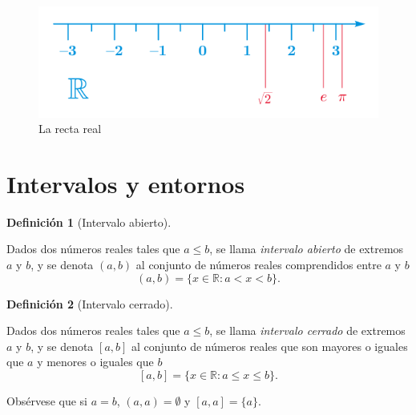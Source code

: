 \documentclass[
  a4paper,
]{scrreport}
\theoremstyle{plain}
\theoremstyle{plain}
\theoremstyle{definition}
\newtheorem{definition}{Definición}[chapter]
\theoremstyle{definition}
\theoremstyle{plain}
\theoremstyle{definition}
\theoremstyle{remark}
\begin{document}
\begin{figure}

{\centering \includegraphics{img/topologia-reales/recta-real.png}

}

\caption{La recta real}

\end{figure}

\hypertarget{intervalos-y-entornos}{%
\section{Intervalos y entornos}\label{intervalos-y-entornos}}

\begin{definition}[Intervalo
abierto]\protect\hypertarget{def-intervalo-abierto}{}\label{def-intervalo-abierto}

Dados dos números reales tales que \(a\leq b\), se llama \emph{intervalo
abierto} de extremos \(a\) y \(b\), y se denota \((a,b)\) al conjunto de
números reales comprendidos entre \(a\) y \(b\) \[
(a,b) = \{x\in \mathbb{R}: a<x<b\}.
\]

\end{definition}

\begin{definition}[Intervalo
cerrado]\protect\hypertarget{def-intervalo-cerrado}{}\label{def-intervalo-cerrado}

Dados dos números reales tales que \(a\leq b\), se llama \emph{intervalo
cerrado} de extremos \(a\) y \(b\), y se denota \([a,b]\) al conjunto de
números reales que son mayores o iguales que \(a\) y menores o iguales
que \(b\) \[
[a,b] = \{x\in \mathbb{R}: a\leq x\leq b\}.
\]

\end{definition}

\begin{tcolorbox}[enhanced jigsaw, rightrule=.15mm, toptitle=1mm, colbacktitle=quarto-callout-warning-color!10!white, bottomrule=.15mm, opacityback=0, arc=.35mm, breakable, toprule=.15mm, left=2mm, coltitle=black, colback=white, opacitybacktitle=0.6, titlerule=0mm, colframe=quarto-callout-warning-color-frame, bottomtitle=1mm, title=\textcolor{quarto-callout-warning-color}{\faExclamationTriangle}\hspace{0.5em}{Advertencia}, leftrule=.75mm]

Obsérvese que si \(a=b\), \((a,a)=\emptyset\) y \([a,a]=\{a\}\).

\end{tcolorbox}
\end{document}
